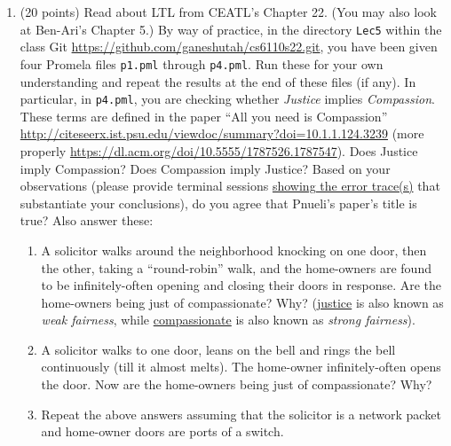 \documentclass[11pt]{article}
\begin{document}
\begin{enumerate}
  
\item (20 points) Read about LTL from 
  CEATL's Chapter 22.
  (You may also look at Ben-Ari's Chapter 5.)
  By way of practice,
  in the directory {\tt Lec5}
  within the class Git
  \url{https://github.com/ganeshutah/cs6110s22.git},
  you have been given four Promela files {\tt p1.pml}
  through {\tt p4.pml}.   
  Run these for your own understanding and repeat the results
  at the end of these files (if any).
  In particular, in {\tt p4.pml}, you are checking
  whether {\em Justice} implies {\em Compassion}.
  These terms are defined in the paper
  ``All you need is Compassion''
  \url{http://citeseerx.ist.psu.edu/viewdoc/summary?doi=10.1.1.124.3239}
  (more properly \url{https://dl.acm.org/doi/10.5555/1787526.1787547}).
  Does Justice imply Compassion?
  Does Compassion imply Justice?
  Based on your observations (please provide terminal sessions \underline{showing
  the error trace(s)} that substantiate your conclusions),
  do you agree that Pnueli's paper's title is true?
  Also answer these:
  \begin{enumerate}
  \item A solicitor walks around the neighborhood knocking on one door,
    then the other, taking a ``round-robin'' walk, and the home-owners
    are found to be infinitely-often opening and closing their doors
    in response.
    Are the home-owners being just of compassionate? Why?
    (\underline{justice} is also known as {\em weak fairness}, while
    \underline{compassionate} is also known as {\em strong fairness}).

  \item A solicitor walks to one door, leans on the bell and rings
    the bell continuously (till it almost melts).
    The home-owner infinitely-often opens the door.
    Now are the home-owners being just of compassionate?     Why?

  \item Repeat the above answers assuming that the solicitor is
    a network packet and home-owner doors are ports of a switch.
  \end{enumerate}


\newlength{\minpagw}
\settowidth{\minpagw}{\hspace{40em}}

\begin{minipage}{\minpagw}
\end{minipage}
\end{enumerate}
\end{document}
